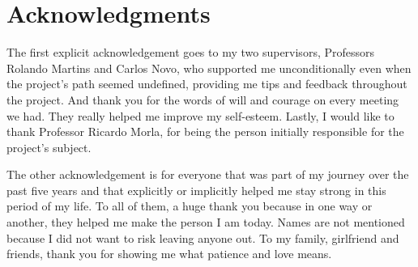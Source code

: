 \chapter*{Acknowledgments}

The first explicit acknowledgement goes to my two supervisors, Professors Rolando Martins and Carlos Novo, who supported me unconditionally even when the project's path seemed undefined, providing me tips and feedback throughout the project. And thank you for the words of will and courage on every meeting we had. They really helped me improve my self-esteem. Lastly, I would like to thank Professor Ricardo Morla, for being the person initially responsible for the project's subject.  


The other acknowledgement is for everyone that was part of my journey over the past five years and that explicitly or implicitly helped me stay strong in this period of my life. To all of them, a huge thank you because in one way or another, they helped me make the person I am today. Names are not mentioned because I did not want to risk leaving anyone out. To my family, girlfriend and friends, thank you for showing me what patience and love means.

\vspace{10mm}
